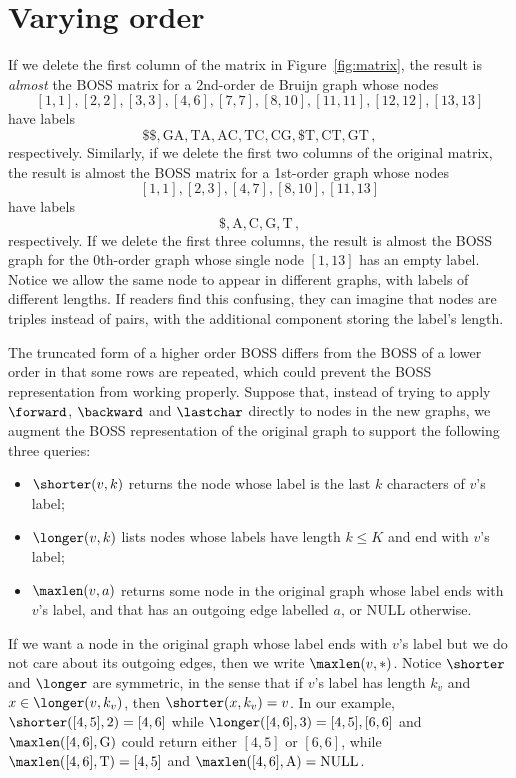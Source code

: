 
\section{Varying order}
\label{sec:changing}

If we delete the first column of the matrix in Figure~\ref{fig:matrix}, the result is {\em almost} the BOSS matrix for a 2nd-order de Bruijn graph whose nodes
\[[1, 1], [2, 2], [3, 3], [4, 6], [7, 7], [8, 10], [11, 11], [12, 12], [13, 13]\]
have labels
\[\mathrm{\$\$, GA, TA, AC, TC, CG, \$T, CT, GT}\,,\]
respectively.  Similarly, if we delete the first two columns of the original matrix, the result is almost the BOSS matrix for a 1st-order graph whose nodes
\[[1, 1], [2, 3], [4, 7], [8, 10], [11, 13]\]
have labels
\[\mathrm{\$, A, C, G, T}\,,\]
respectively.  If we delete the first three columns, the result is almost the BOSS graph for the 0th-order graph whose single node \([1, 13]\) has an empty label.  Notice we allow the same node to appear in different graphs, with labels of different lengths.  If readers find this confusing, they can imagine that nodes are triples instead of pairs, with the additional component storing the label's length.

The truncated form of a higher order BOSS differs from the BOSS of a lower order in that
some rows are repeated, which could prevent the BOSS representation from working properly.  Suppose that, instead of trying to apply $\forward$, $\backward$ and $\lastchar$ directly to nodes in the new graphs, we augment the BOSS representation of the original graph to support the following three queries:
\begin{itemize}
\item $\shorter(v, k)$ returns the node whose label is the last $k$ characters of $v$'s label;
\item $\longer(v, k)$ lists nodes whose labels have length \(k \leq K\) and end with $v$'s label;
\item $\maxlen(v, a)$ returns some node in the original graph whose label ends with $v$'s label, and that has an outgoing edge labelled $a$, or NULL otherwise. %
\end{itemize}
If we want a node in the original graph whose label ends with $v$'s label but we do not care about its outgoing edges, then we write \(\maxlen(v, *)\).  Notice $\shorter$ and $\longer$ are symmetric, in the sense that if $v$'s label has length $k_v$ and \(x \in \longer(v, k_v)\), then \(\shorter(x, k_v) = v\).  In our example, \(\shorter([4, 5], 2) = [4, 6]\) while \(\longer([4, 6], 3) = [4, 5], [6, 6]\) and \(\maxlen ([4, 6], \mathrm{G})\) could return either \([4, 5]\) or \([6, 6]\), while \(\maxlen([4, 6], \mathrm{T}) = [4, 5]\) and \(\maxlen([4, 6], \mathrm{A}) = \mathrm{NULL}\).

